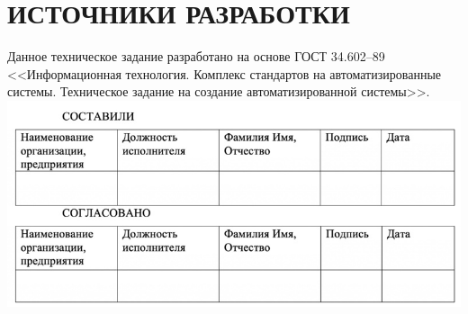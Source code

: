 \documentclass[12pt,a4paper]{article}
\begin{document}
\section{ИСТОЧНИКИ РАЗРАБОТКИ}
Данное техническое задание разработано на основе ГОСТ 34.602–89 <<Информационная технология. Комплекс стандартов на автоматизированные системы. Техническое задание на создание автоматизированной системы>>.
\newpage
\includegraphics[scale = 0.6]{Рисунки/sostavily.jpg}
\end{document}
